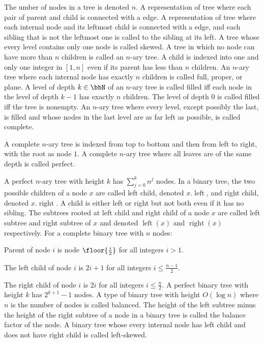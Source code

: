 \documentclass[a4paper,12pt]{article}
\begin{document}
\item The umber of nodes in a tree is denoted $n$.
\eit
{}
A representation of tree where each pair of parent and child is connected with a edge.
A representation of tree where each internal node and its leftmost child is connected with a edge, and each sibling that is not the leftmost one is called to the sibling at its left.
A tree whose every level contains only one node is called skewed.
A tree in which no node can have more than $n$ children is called an $n$-ary tree. A child is indexed into one and only one integer in $[1,n]$ even if its parent has less than $n$ children.
An $n$-ary tree where each internal node has exactly $n$ children is called full, proper, or plane.
A level of depth $k\in\bbN$ of an $n$-ary tree is called filled iff each node in the level of depth $k-1$ has exactly $n$ children. The level of depth 0 is called filled iff the tree is nonempty.
An $n$-ary tree where every level, except possibly the last, is filled and whose nodes in the last level are as far left as possible, is called complete.

A complete $n$-ary tree is indexed from top to bottom and then from left to right, with the root as node $1$.
A complete $n$-ary tree where all leaves are of the same depth is called perfect.

A perfect $n$-ary tree with height $k$ has $\sum_{j=0}^kn^j$ nodes.
In a binary tree, the two possible children of a node $x$ are called left child, denoted $x.\operatorname{left}$, and right child, denoted $x.\operatorname{right}$. A child is either left or right but not both even if it has no sibling. The subtrees rooted at left child and right child of a node $x$ are called left subtree and right subtree of $x$ and denoted $\operatorname{left}(x)$ and $\operatorname{right}(x)$ respectively.
For a complete binary tree with $n$ nodes:
\bit
\item Parent of node $i$ is node $\floor{\frac{i}{2}}$ for all integers $i>1$.
\item The left child of node $i$ is $2i+1$ for all integers $i\le\frac{n-1}{2}$.
\item The right child of node $i$ is $2i$ for all integers $i\le\frac{n}{2}$.
\eit
{}
A perfect binary tree with height $k$ has $2^{k+1}-1$ nodes.
A type of binary tree with height $O(\log n)$ where $n$ is the number of nodes is called balanced.
The height of the left subtree minus the height of the right subtree of a node in a binary tree is called the balance factor of the node.
A binary tree whose every internal node has left child and does not have right child is called left-skewed.
\end{document}
